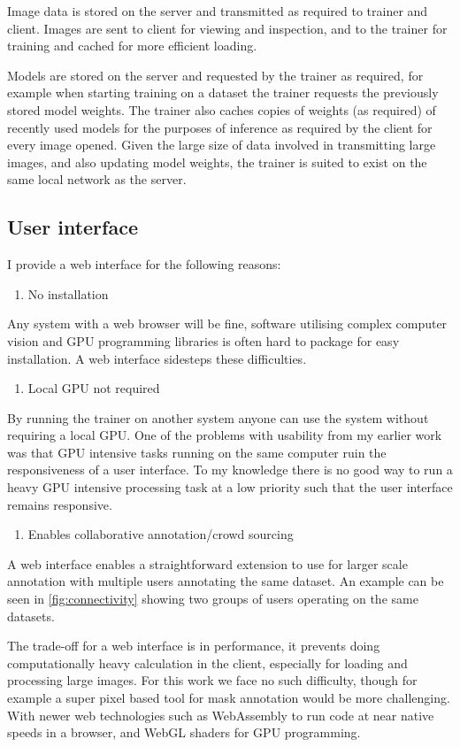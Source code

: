Image data is stored on the server and transmitted as required to trainer and client. Images are sent to client for viewing and inspection, and to the trainer for training and cached for more efficient loading. 

Models are stored on the server and requested by the trainer as required, for example when starting training on a dataset the trainer requests the previously stored model weights. The trainer also caches copies of weights (as required) of recently used models for the purposes of inference as required by the client for every image opened. Given the large size of data involved in transmitting large images, and also updating model weights, the trainer is suited to exist on the same local network as the server. 



\subsection {User interface}

I provide a web interface for the following reasons:

\begin{enumerate}
    \item No installation
\end{enumerate}
Any system with a web browser will be fine, software utilising complex computer vision and GPU programming libraries is often hard to package for easy installation. A web interface sidesteps these difficulties.
\begin{enumerate}[resume]
    \item Local GPU not required
\end{enumerate}
By running the trainer on another system anyone can use the system without requiring a local GPU. One of the problems with usability from my earlier work was that GPU intensive tasks running on the same computer ruin the responsiveness of a user interface. To my knowledge there is no good way to run a heavy \gls{GPU} intensive processing task at a low priority such that the user interface remains responsive.
\begin{enumerate}[resume]
    \item Enables collaborative annotation/crowd sourcing
\end{enumerate}
A web interface enables a straightforward extension to use for larger scale annotation with multiple users annotating the same dataset. An example can be seen in \ref{fig:connectivity} showing two groups of users operating on the same datasets.


The trade-off for a web interface is in performance, it prevents doing computationally heavy calculation in the client, especially for loading and processing large images. For this work we face no such difficulty, though for example a super pixel based tool for mask annotation would be more challenging. With newer web technologies such as WebAssembly \cite{Haas2017} to run code at near native speeds in a browser, and WebGL shaders for GPU programming.

